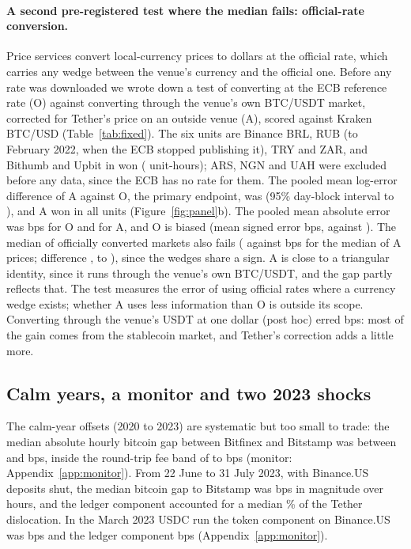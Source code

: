 \documentclass[sigconf,review,anonymous]{acmart}
\begin{document}
\paragraph{A second pre-registered test where the median fails: official-rate conversion.} Price services convert local-currency
prices to dollars at the official rate, which carries any wedge between the venue's currency and the official one. Before any rate was
downloaded we wrote down a test of converting at the ECB reference rate (O) against converting through the venue's own BTC/USDT market,
corrected for Tether's price on an outside venue (A), scored against Kraken BTC/USD (Table~\ref{tab:fixed}). The six units are Binance BRL, RUB (to
February 2022, when the ECB stopped publishing it), TRY and ZAR, and Bithumb and Upbit in won (\NumPFPrimHours{} unit-hours); ARS, NGN and UAH were excluded before
any data, since the ECB has no rate for them. The pooled mean log-error difference of A against O, the primary endpoint, was \NumPFPrimMean{}
(95\% day-block interval \NumPFPrimLo{} to \NumPFPrimHi{}), and A won in all \NumPFUnitsSuccess{} units (Figure~\ref{fig:panel}b). The pooled mean absolute error was \NumPFMaeO{} bps
for O and \NumPFMaeA{} for A, and O is biased (mean signed error \NumPFBiasO{} bps, against \NumPFBiasA{}). The median of officially converted markets also fails
(\NumPFFusMOMae{} against \NumPFFusMAMae{} bps for the median of A prices; difference \NumPFFusMean{}, \NumPFFusLo{} to \NumPFFusHi{}), since the wedges share a sign.
A is close to a triangular identity, since it runs through the venue's own BTC/USDT, and the gap partly reflects that. The test measures
the error of using official rates where a currency wedge exists; whether A uses less information than O is outside its scope. Converting through the venue's USDT at one dollar (post hoc) erred
\NumEXCompMaeC{} bps: most of the gain comes from the stablecoin market, and Tether's correction adds a little more.

\subsection{Calm years, a monitor and two 2023 shocks}
\label{sec:noise}\label{sec:monitor}\label{sec:2023}\label{sec:shocks}
The calm-year offsets (2020 to 2023) are systematic but too small to trade: the median absolute hourly bitcoin gap between
Bitfinex and Bitstamp was between \NumNBfxBstGapBtcMin{} and \NumNBfxBstGapBtcMax{} bps, inside the round-trip fee band of
\NumNBandMin{} to \NumNBandMax{} bps (monitor: Appendix~\ref{app:monitor}). From 22 June to 31 July 2023, with Binance.US deposits shut, the median bitcoin gap to Bitstamp was \NumUBnusMedBps{} bps in
magnitude over \NumUBnusHours{} hours, and the ledger component accounted for a median \NumDecBnusShare\% of the Tether
dislocation. In the March 2023 USDC run the token component on Binance.US was
\NumDecSvbT{} bps and the ledger component \NumDecSvbL{} bps (Appendix~\ref{app:monitor}).
\end{document}
